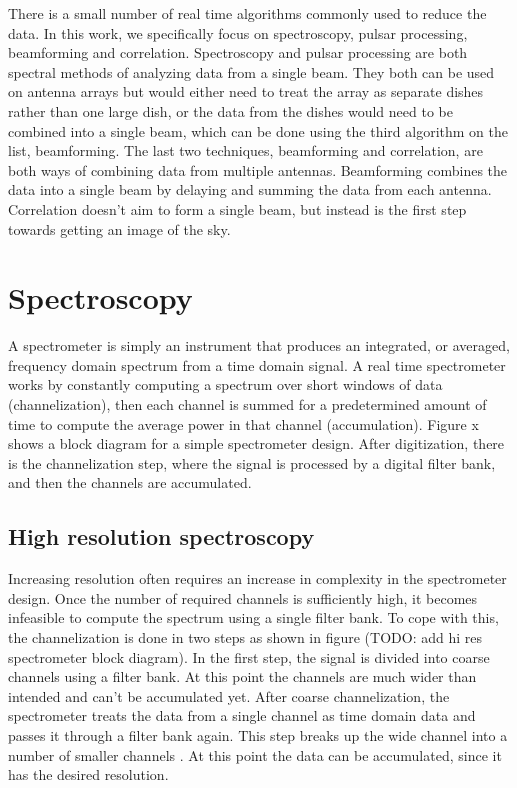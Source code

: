 There is a small number of real time algorithms commonly used to reduce the data. 
In this work, we specifically focus on spectroscopy, pulsar processing, beamforming and correlation. 
Spectroscopy and pulsar processing are both spectral methods of analyzing data from a single beam.
They both can be used on antenna arrays but would either need to treat the array as separate dishes rather than one large dish, or the data from the dishes would need to be combined into a single beam, which can be done using the third algorithm on the list, beamforming. 
The last two techniques, beamforming and correlation, are both ways of combining data from multiple antennas. 
Beamforming combines the data into a single beam by delaying and summing the data from each antenna.
Correlation doesn't aim to form a single beam, but instead is the first step towards getting an image of the sky. 




\section{Spectroscopy}
\label{sec:Spectroscopy}
A spectrometer is simply an instrument that produces an integrated, or averaged, frequency domain spectrum from a time domain signal. 
A real time spectrometer works by constantly computing a spectrum over short windows of data (channelization), then each channel is summed for a predetermined amount of time to compute the average power in that channel (accumulation). 
Figure x shows a block diagram for a simple spectrometer design. 
After digitization, there is the channelization step, where the signal is processed by a digital filter bank, and then the channels are accumulated. 

\subsection{High resolution spectroscopy}
Increasing resolution often requires an increase in complexity in the spectrometer design. 
Once the number of required channels is sufficiently high, it becomes infeasible to compute the spectrum using a single filter bank. 
To cope with this, the channelization is done in two steps as shown in figure (TODO: add hi res spectrometer block diagram). 
In the first step, the signal is divided into coarse channels using a filter bank. 
At this point the channels are much wider than intended and can't be accumulated yet. 
After coarse channelization, the spectrometer treats the data from a single channel as time domain data and passes it through a filter bank again. 
This step breaks up the wide channel into a number of smaller channels . At this point the data can be accumulated, since it has the desired resolution.

